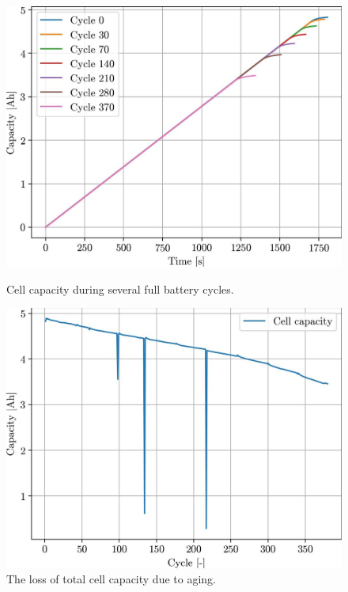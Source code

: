 \begin{figure}
\centering
\begin{minipage}{0.49\textwidth}
    \centering
    \includegraphics[width=\linewidth]{figures/12/capacities.jpg}
    \caption{Cell capacity during several full battery cycles.}
    \label{fig:12-capacities}
\end{minipage}
\hfill
\begin{minipage}{0.49\textwidth}
    \centering
    \includegraphics[width=\linewidth]{figures/12/aging.jpg}
    \caption{The loss of total cell capacity due to aging.}
    \label{fig:12-aging}
\end{minipage}
\end{figure}

